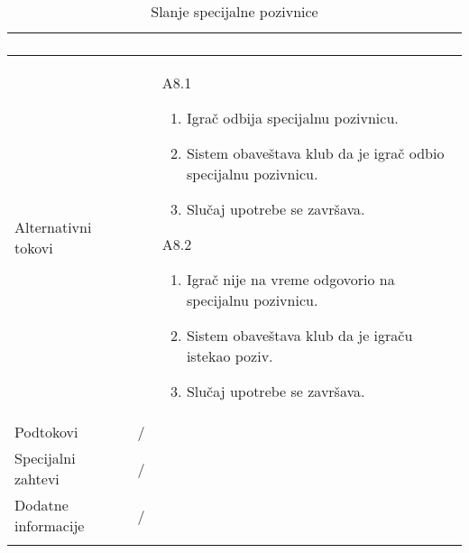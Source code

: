 \documentclass{article}
\begin{document}
\begin{longtable}{| p{} | p{} |}
\begin{enumerate}
    \end{enumerate}\\
\hline
    Alternativni tokovi & \begin{enumerate}
        \item [A8.1] \begin{enumerate}
            \item Igrač odbija specijalnu pozivnicu.
            \item Sistem obaveštava klub da je igrač odbio specijalnu pozivnicu.
            \item Slučaj upotrebe se završava.
        \end{enumerate} 
        \item [A8.2] \begin{enumerate}
            \item Igrač nije na vreme odgovorio na specijalnu pozivnicu.
            \item Sistem obaveštava klub da je igraču istekao poziv.
            \item Slučaj upotrebe se završava.
        \end{enumerate} 
    \end{enumerate}\\
\hline
    Podtokovi & /\\
\hline
    Specijalni zahtevi & /\\
\hline
    Dodatne informacije & / \\
\hline
 
\caption{Slanje specijalne pozivnice} 
\end{longtable}
\end{document}

